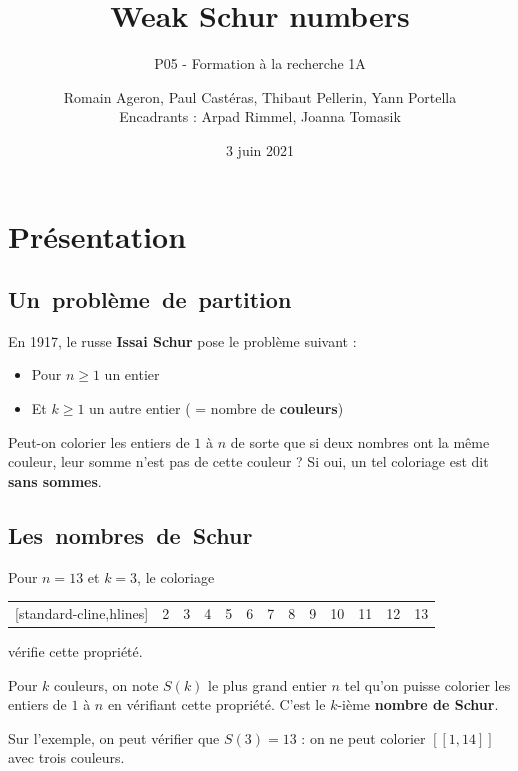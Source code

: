 \documentclass[graphics]{beamer}
\title[Weak Schur numbers]{Weak Schur numbers}
\subtitle{P05 - Formation à la recherche 1A}
\author[R. Ageron, P. Castéras, T. Pellerin, Y. Portella]{Romain Ageron, Paul Castéras, Thibaut Pellerin, Yann Portella\\Encadrants : Arpad Rimmel, Joanna Tomasik}
\date{3 juin 2021}
\begin{document}
\begin{frame}
\titlepage
\end{frame}

\section{Présentation}
\subsection{Un~problème~de~partition}
\begin{frame}
	En 1917, le russe \textbf{Issai Schur} pose le problème suivant :
	\pause
	\begin{itemize}
		\item Pour \(n \geq 1\) un entier
		\item Et \(k \geq 1\) un autre entier ( = nombre de \textbf{couleurs})
	\end{itemize}
	
	\vspace{2ex}
	\pause
	\begin{tcolorbox}[colback=green!5,colframe=green!40!black,title=Question]
		Peut-on colorier les entiers de \(1\) à \(n\) de sorte que si deux nombres ont la même couleur,
		leur somme n'est pas de cette couleur ? Si oui, un tel coloriage est dit \textbf{sans sommes}.
	\end{tcolorbox}
\end{frame}

\subsection{Les~nombres~de~Schur}

\begin{frame}
	Pour \(n = 13\) et \(k = 3\), le coloriage \\
	\begin{center}
	\begin{NiceTabular}{|*{13}{c|}}[standard-cline,hlines]
		\CodeBefore
		 & 2 & 3 & 4 & 5 & 6 & 7 & 8 & 9 & 10 & 11 & 12 & 13\\
	\end{NiceTabular}
	\end{center}
	vérifie cette propriété.
	\pause
	\begin{tcolorbox}[colback=red!5,colframe=red!40!black,title=Définition]
		Pour \(k\) couleurs, on note \(S(k)\) le plus grand entier \(n\) tel qu'on puisse colorier les entiers de
		\(1\) à \(n\) en vérifiant cette propriété. C'est le \(k\)-ième \textbf{nombre de Schur}.
	\end{tcolorbox}
	\pause
	Sur l'exemple, on peut vérifier que \(S(3) = 13\) : on ne peut colorier \([\![1,14]\!]\) avec trois couleurs.
\end{frame}
\end{document}
